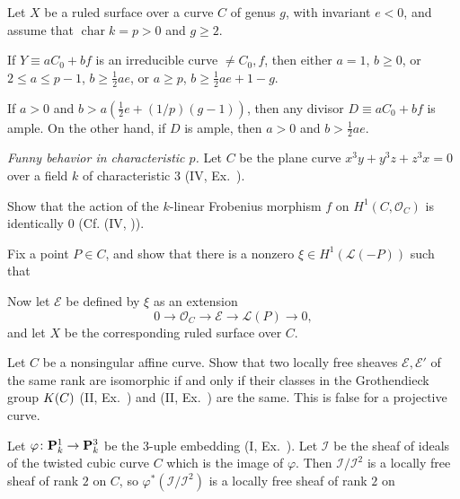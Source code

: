 {{\begin{description}[style=multiline,labelwidth=3em,leftmargin=3.28em,itemsep=3pt,topsep=0pt,parsep=0pt]
\item[\hypertarget{ex-V-2.14}{}2.14.] Let $X$ be a ruled surface over a curve $C$ of genus $g$, with invariant $e<0$, and assume that $\operatorname{char}k=p>0$ and $g\ge2$.
\begin{parts}
\item If $Y\equiv aC_0+bf$ is an irreducible curve $\ne C_0,f$, then either $a=1$, $b\ge0$, or $2\le a\le p-1$, $b\ge\frac12ae$, or $a\ge p$, $b\ge\frac12ae+1-g$.
\item If $a>0$ and $b>a(\frac12e+(1/p)(g-1))$, then any divisor $D\equiv aC_0+bf$ is ample. On the other hand, if $D$ is ample, then $a>0$ and $b>\frac12ae$.
\end{parts}
\item[\hypertarget{ex-V-2.15}{}2.15.] \emph{Funny behavior in characteristic $p$.} Let $C$ be the plane curve $x^3y+y^3z+z^3x=0$ over a field $k$ of characteristic $3$ (IV, Ex.~).
\begin{parts}
\item Show that the action of the $k$-linear Frobenius morphism $f$ on $H^1(C,\mathcal O_C)$ is identically $0$ (Cf. (IV, )).
\item Fix a point $P\in C$, and show that there is a nonzero $\xi\in H^1(\mathcal L(-P))$ such that 
\item Now let $\mathcal E$ be defined by $\xi$ as an extension
\[
0\longrightarrow\mathcal O_C\longrightarrow\mathcal E\longrightarrow\mathcal L(P)\longrightarrow0,
\]
and let $X$ be the corresponding ruled surface over $C$. 
\end{parts}
\item[\hypertarget{ex-V-2.16}{}2.16.] Let $C$ be a nonsingular affine curve. Show that two locally free sheaves $\mathcal E,\mathcal E'$ of the same rank are isomorphic if and only if their classes in the Grothendieck group $K(C)$ (II, Ex.~) and (II, Ex.~) are the same. This is false for a projective curve.
\item[\hypertarget{ex-V-2.17}{}*2.17.]
\begin{parts}
\item\hypertarget{ex-V-2.17a}{} Let $\varphi\colon\mathbf{P}_k^1\to\mathbf{P}_k^3$ be the 3-uple embedding (I, Ex.~). Let $\mathcal I$ be the sheaf of ideals of the twisted cubic curve $C$ which is the image of $\varphi$. Then $\mathcal I/\mathcal I^2$ is a locally free sheaf of rank $2$ on $C$, so $\varphi^*(\mathcal I/\mathcal I^2)$ is a locally free sheaf of rank $2$ on
\end{parts}
\end{description}
}
}
